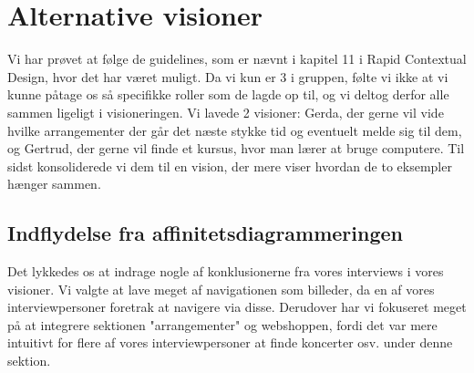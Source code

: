 \section{Alternative visioner}
Vi har prøvet at følge de guidelines, som er nævnt i kapitel 11 i Rapid Contextual Design, hvor det har været muligt.
Da vi kun er 3 i gruppen, følte vi ikke at vi kunne påtage os så specifikke roller som de lagde op til, og vi deltog derfor
alle sammen ligeligt i visioneringen. Vi lavede 2 visioner: Gerda, der gerne vil vide hvilke arrangementer der går det næste stykke tid
og eventuelt melde sig til dem, og Gertrud, der gerne vil finde et kursus, hvor man lærer at bruge computere. Til sidst konsoliderede vi dem
til en vision, der mere viser hvordan de to eksempler hænger sammen.

\subsection{Indflydelse fra affinitetsdiagrammeringen}
Det lykkedes os at indrage nogle af konklusionerne fra vores interviews i vores visioner. Vi valgte at lave meget af navigationen som billeder, da 
en af vores interviewpersoner foretrak at navigere via disse. Derudover har vi fokuseret meget på at integrere sektionen "arrangementer" og webshoppen,
fordi det var mere intuitivt for flere af vores interviewpersoner at finde koncerter osv. under denne sektion. 


